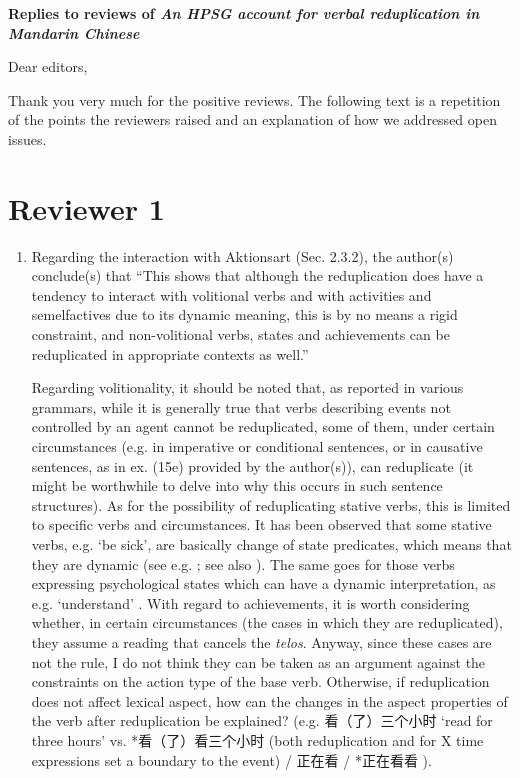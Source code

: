 \documentclass[fleqn,twoside]{article}
\begin{document}
\noindent
{\large\bf Replies to reviews of \emph{An HPSG account for verbal reduplication in Mandarin Chinese}}

\bigskip

\noindent
Dear editors,

Thank you very much for the positive reviews. The following text is a repetition of the points the
reviewers raised and an explanation of how we addressed open issues.

\section{Reviewer 1}\label{sec:1}

\begin{enumerate}
\item
Regarding the interaction with Aktionsart (Sec. 2.3.2), the author(s) conclude(s) that ``This shows
that although the reduplication does have a tendency to interact with volitional verbs and with
activities and semelfactives due to its dynamic meaning, this is by no means a rigid constraint, and
non-volitional verbs, states and achievements can be reduplicated in appropriate contexts as well.''

Regarding volitionality, it should be noted that, as reported in various grammars, while it is generally true that verbs describing events not controlled by an agent cannot be reduplicated, some of them, under certain circumstances (e.g. in imperative or conditional sentences, or in causative  sentences, as in ex. (15e) provided by the author(s)), can reduplicate (it might be worthwhile to delve into why this occurs in such sentence structures). As for the possibility of reduplicating stative verbs, this is limited to specific verbs and circumstances. It has been observed that some stative verbs, e.g.  ‘be sick’, are basically change of state predicates, which means that they are dynamic (see e.g. \citealt[663]{Tham2013}; see also \citealt{Sybesma1997, Liu2010, PeckEtAl2013, Basciano2019}). The same goes for those verbs expressing psychological states which can have a dynamic interpretation, as e.g.  `understand' \citep[fn. 3]{BascianoMelloni2017}. 
With regard to achievements, it is worth considering whether, in certain circumstances (the cases in which they are reduplicated), they assume a reading that cancels the \textit{telos}. Anyway, since these cases are not the rule, I do not think they can be taken as an argument against the constraints on the action type of the base verb. Otherwise, if reduplication does not affect lexical aspect, how can the changes in the aspect properties of the verb after reduplication be explained? (e.g. 看（了）三个小时      `read for three hours' vs. *看（了）看三个小时       (both reduplication and for X time expressions set a boundary to the event) / 正在看   / *正在看看   ). 


\end{enumerate}
\end{document}
